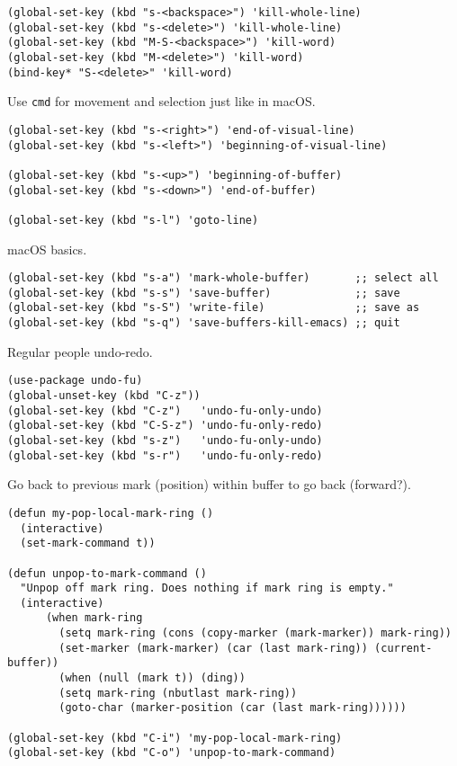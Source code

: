 \documentclass[11pt]{article}
\begin{document}
\begin{verbatim}
(global-set-key (kbd "s-<backspace>") 'kill-whole-line)
(global-set-key (kbd "s-<delete>") 'kill-whole-line)
(global-set-key (kbd "M-S-<backspace>") 'kill-word)
(global-set-key (kbd "M-<delete>") 'kill-word)
(bind-key* "S-<delete>" 'kill-word)
\end{verbatim}

Use \texttt{cmd} for movement and selection just like in macOS.

\begin{verbatim}
(global-set-key (kbd "s-<right>") 'end-of-visual-line)
(global-set-key (kbd "s-<left>") 'beginning-of-visual-line)

(global-set-key (kbd "s-<up>") 'beginning-of-buffer)
(global-set-key (kbd "s-<down>") 'end-of-buffer)

(global-set-key (kbd "s-l") 'goto-line)
\end{verbatim}

macOS basics.

\begin{verbatim}
(global-set-key (kbd "s-a") 'mark-whole-buffer)       ;; select all
(global-set-key (kbd "s-s") 'save-buffer)             ;; save
(global-set-key (kbd "s-S") 'write-file)              ;; save as
(global-set-key (kbd "s-q") 'save-buffers-kill-emacs) ;; quit
\end{verbatim}

Regular people undo-redo.

\begin{verbatim}
(use-package undo-fu)
(global-unset-key (kbd "C-z"))
(global-set-key (kbd "C-z")   'undo-fu-only-undo)
(global-set-key (kbd "C-S-z") 'undo-fu-only-redo)
(global-set-key (kbd "s-z")   'undo-fu-only-undo)
(global-set-key (kbd "s-r")   'undo-fu-only-redo)
\end{verbatim}

Go back to previous mark (position) within buffer to go back (forward?).

\begin{verbatim}
(defun my-pop-local-mark-ring ()
  (interactive)
  (set-mark-command t))

(defun unpop-to-mark-command ()
  "Unpop off mark ring. Does nothing if mark ring is empty."
  (interactive)
      (when mark-ring
        (setq mark-ring (cons (copy-marker (mark-marker)) mark-ring))
        (set-marker (mark-marker) (car (last mark-ring)) (current-buffer))
        (when (null (mark t)) (ding))
        (setq mark-ring (nbutlast mark-ring))
        (goto-char (marker-position (car (last mark-ring))))))

(global-set-key (kbd "C-i") 'my-pop-local-mark-ring)
(global-set-key (kbd "C-o") 'unpop-to-mark-command)
\end{verbatim}
\end{document}
